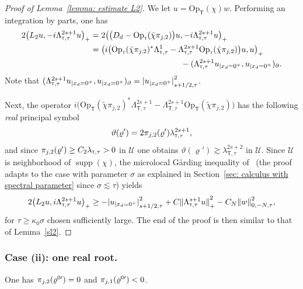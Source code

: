 \documentclass[10pt]{amsart}
\theoremstyle{plain}
\theoremstyle{definition}
\newcommand{\nhd}{neighborhood\xspace}
\newcommand{\suff}{sufficiently\xspace}
\let\k\kappa
\let\y\varrho
\newcommand{\tchi}{\tilde{\chi}}
\let \Re \relax
\DeclareMathOperator{\Re}{Re}
\let \Im \relax
\DeclareMathOperator{\Im}{Im}
\newcommand{\inp}[2]{(#1, #2)}
\newcommand{\biginp}[2]{\big(#1, #2 \big)}
\newcommand{\U}{\mathscr U}
\newcommand{\br}{\ensuremath{_{|x_d=0^+}}}
\newcommand{\Opt}{\ensuremath{\mathrm{Op}_{\scriptscriptstyle{\mathsf{T}}}}}
\newcommand{\Norm}[2]{{\| #1 \|}_{#2}}
\newcommand{\Normsc}[2]{{\| #1 \|}_{#2, \tau}}
\newcommand{\normsc}[2]{{| #1 |}_{#2, \tau}}
\newcommand{\lsct}{\lambda_{{\scriptscriptstyle{\mathsf T}},\tau}}
\newcommand{\Lsct}{\Lambda_{{\scriptscriptstyle{\mathsf T}},\tau}}
\DeclareMathOperator{\supp}{supp}
\begin{document}
\begin{proof}[Proof of Lemma~\ref{lemma: estimate L2}]
We let $u=\Opt(\chi)w$. Performing an integration by parts, one has
\begin{align*}
2\Re\biginp{L_2 u}{-i\Lsct^{2s+1} u}_+
& = 2\Re\biginp{ \big(D_d-\Opt(\tchi\pi_{j,2})\big)u} {-i\Lsct^{2s+1} u}_+\\
&= \Re \biginp{i
\big(\Opt(\tchi\pi_{j,2})^*\Lsct^1 - \Lsct^{2s+1}\Opt(\tchi\pi_{j,2})\big)
u}{u}_+\\
&\hspace*{3.9cm} - \Re\inp{\Lsct^{2s+1}u\br}{u\br}_{\partial}.
\end{align*}
Note that
$\Re\inp{\Lsct^{2s+1}u\br}{u\br}_{\partial}
= \normsc{u\br}{s+1/2}^2$.

Next, the operator
$i \big(\Opt(\tchi\pi_{j,2})^*\Lsct^{2s+1}
-\Lsct^{2s+1}\Opt(\tchi\pi_{j,2})\big) $
has the following \emph{real} principal symbol
\begin{equation*}
\vartheta(\y')=2\Im\pi_{j,2}(\y')\lsct^{2s+1},
\end{equation*}
and since $\Im\pi_{j,2}(\y') \geq C_2 \lsct >0$ in $\U$ one obtains
$\vartheta(\y')\gtrsim\lsct^{2s+2}$ in $\U$. Since $\U$ is \nhd of
$\supp(\chi)$, the microlocal G{\aa}rding inequality of~\cite[Th.\,2.49]{JGL-vol1} (the proof adapts to the case with parameter $\sigma$ as
explained in Section~\ref{sec: calculus with spectral parameter} since $\sigma
\lesssim \tau$) yields
\begin{equation*}
2\Re\biginp{L_2 u}{i\Lsct^{2s+1} u}_+
\geq - \normsc{u\br}{s+1/2}^2
+C\Norm{\Lsct^{s+1}u}{+}^2
-C_N\Normsc{w}{0,-N}^2,
\end{equation*}
for $\tau\geq \k_0\sigma$ chosen \suff
large.
The end of the proof is then similar to that of Lemma~\ref{sl2}.
\end{proof}

\subsubsection{Case (ii): one real root.}
\label{sec: Case 1: one root up}
One has
$\Im\pi_{j,2}(\y^{0\prime}) = 0$ and $\Im \pi_{j,1} (\y^{0\prime})<0$.
\end{document}
